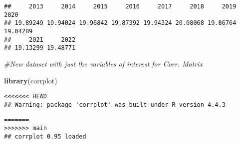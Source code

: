 \documentclass[
]{article}
\newenvironment{Shaded}{\begin{snugshade}}{\end{snugshade}}
\newcommand{\AttributeTok}[1]{\textcolor[rgb]{0.13,0.29,0.53}{#1}}
\newcommand{\CommentTok}[1]{\textcolor[rgb]{0.56,0.35,0.01}{\textit{#1}}}
\newcommand{\ConstantTok}[1]{\textcolor[rgb]{0.56,0.35,0.01}{#1}}
\newcommand{\FunctionTok}[1]{\textcolor[rgb]{0.13,0.29,0.53}{\textbf{#1}}}
\newcommand{\NormalTok}[1]{#1}
\newcommand{\SpecialCharTok}[1]{\textcolor[rgb]{0.81,0.36,0.00}{\textbf{#1}}}
\begin{document}
\begin{Shaded}
\end{Shaded}

\begin{verbatim}
##     2013     2014     2015     2016     2017     2018     2019     2020 
## 19.89249 19.94024 19.96842 19.87392 19.94324 20.08068 19.86764 19.04289 
##     2021     2022 
## 19.13299 19.48771
\end{verbatim}

\begin{Shaded}
\begin{Highlighting}[]
\CommentTok{\#New dataset with just the variables of interest for Corr. Matrix}

\FunctionTok{library}\NormalTok{(corrplot)}
\end{Highlighting}
\end{Shaded}

\begin{verbatim}
<<<<<<< HEAD
## Warning: package 'corrplot' was built under R version 4.4.3
\end{verbatim}

\begin{verbatim}
=======
>>>>>>> main
## corrplot 0.95 loaded
\end{verbatim}
\end{document}
